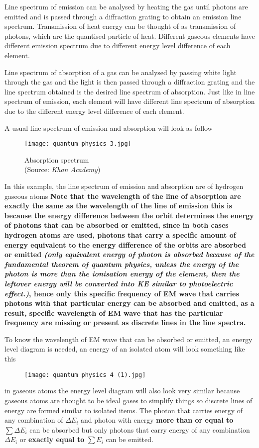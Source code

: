 \documentclass{article}
\begin{document}
 Line spectrum of emission can be analysed by heating the gas until photons are emitted and is passed through a diffraction grating to obtain an emission line spectrum. Transmission of heat energy can be thought of as transmission of photons, which are the quantised particle of heat. Different gaseous elements have different emission spectrum due to different energy level difference of each element.
 
 Line spectrum of absorption of a gas can be analysed by passing white light through the gas and the light is then passed through a diffraction grating and the line spectrum obtained is the desired line spectrum of absorption. Just like in line spectrum of emission, each element will have different line spectrum of absorption due to the different energy level difference of each element. 
 
 A usual line spectrum of emission and absorption will look as follow
 \begin{figure}[H]
     \centering
     \captionsetup{justification=centering,margin=2cm}
     \texttt{[image: quantum physics 3.jpg]}
     \caption*{Absorption spectrum \\ (Source: \textit{Khan Academy})}
 \end{figure}
 
 In this example, the line spectrum of emission and absorption are of hydrogen gaseous atoms \textbf{Note that the wavelength of the line of absorption are exactly the same as the wavelength of the line of emission this is because the energy difference between the orbit determines the energy of photons that can be absorbed or emitted, since in both cases hydrogen atoms are used, photons that carry a specific amount of energy equivalent to the energy difference of the orbits are absorbed or emitted \textit{(only equivalent energy of photon is absorbed because of the fundamental theorem of quantum physics, unless the energy of the photon is more than the ionisation energy of the element, then the leftover energy will be converted into KE similar to photoelectric effect.)}, hence only this specific frequency of EM wave that carries photons with that particular energy can be absorbed and emitted, as a result, specific wavelength of EM wave that has the particular frequency are missing or present as discrete lines in the line spectra.}
 
 To know the wavelength of EM wave that can be absorbed or emitted, an energy level diagram is needed, an energy of an isolated atom will look something like this 
 \begin{figure}[H]
     \centering
     \texttt{[image: quantum physics 4 (1).jpg]}
 \end{figure}
in gaseous atoms the energy level diagram will also look very similar because gaseous atoms are thought to be ideal gases to simplify things so discrete lines of energy are formed similar to isolated items. The photon that carries energy of any combination of $\Delta E_i$ and photon with energy \textbf{more than or equal to} $\sum \Delta E_i$ can be absorbed  but only photons that carry energy of any combination $\Delta E_i$ or \textbf{exactly equal to} $\sum E_i$ can be emitted.
 
\end{document}
